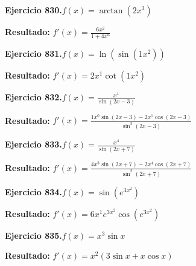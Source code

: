 \documentclass[10pt,a4paper]{article}
\begin{document}
\begin{ejbox}
\textbf{Ejercicio 830.}\quad $f(x) = \arctan(2x^{3})$
\end{ejbox}

\begin{solbox}
\textbf{Resultado:} \(\displaystyle f'(x) = \frac{6x^{2}}{1+4x^{6}}\)
\end{solbox}

\begin{ejbox}
\textbf{Ejercicio 831.}\quad $f(x) = \ln(\sin(1x^{2}))$
\end{ejbox}

\begin{solbox}
\textbf{Resultado:} \(\displaystyle f'(x) = 2x^{1}\cot(1x^{2})\)
\end{solbox}

\newpage
\begin{ejbox}
\textbf{Ejercicio 832.}\quad $f(x) = \frac{x^{1}}{\sin(2x -3)}$
\end{ejbox}

\begin{solbox}
\textbf{Resultado:} \(\displaystyle f'(x) = \frac{1x^{0}\sin(2x -3) - 2x^{1}\cos(2x -3)}{\sin^2(2x -3)}\)
\end{solbox}

\begin{ejbox}
\textbf{Ejercicio 833.}\quad $f(x) = \frac{x^{4}}{\sin(2x +7)}$
\end{ejbox}

\begin{solbox}
\textbf{Resultado:} \(\displaystyle f'(x) = \frac{4x^{3}\sin(2x +7) - 2x^{4}\cos(2x +7)}{\sin^2(2x +7)}\)
\end{solbox}

\begin{ejbox}
\textbf{Ejercicio 834.}\quad $f(x) = \sin(e^{3x^{2}})$
\end{ejbox}

\begin{solbox}
\textbf{Resultado:} \(\displaystyle f'(x) = 6x^{1}e^{3x^{2}}\cos(e^{3x^{2}})\)
\end{solbox}

\newpage
\begin{ejbox}
\textbf{Ejercicio 835.}\quad $f(x) = x^{3} \sin x$
\end{ejbox}

\begin{solbox}
\textbf{Resultado:} \(\displaystyle f'(x) = x^{2}(3\sin x + x\cos x)\)
\end{solbox}
\end{document}
